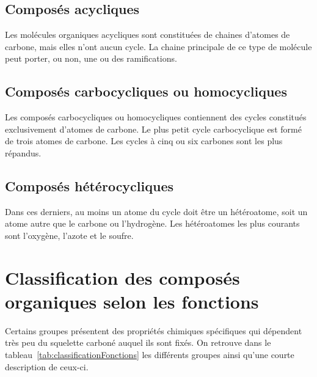 \subsection{Composés acycliques} Les molécules organiques acycliques sont constituées de chaines d'atomes de carbone, mais elles n'ont aucun cycle.
La chaine principale de ce type de molécule peut porter, ou non, une ou des ramifications.
\subsection{Composés carbocycliques ou homocycliques} Les composés carbocycliques ou homocycliques contiennent des cycles constitués exclusivement d'atomes de carbone.
Le plus petit cycle carbocyclique est formé de trois atomes de carbone.
Les cycles à cinq ou six carbones sont les plus répandus.
\subsection{Composés hétérocycliques} Dans ces derniers, au moins un atome du cycle doit être un hétéroatome, soit un atome autre que le carbone ou l'hydrogène.
Les hétéroatomes les plus courants sont l'oxygène, l'azote et le soufre.
\section{Classification des composés organiques selon les fonctions}
Certains groupes présentent des propriétés chimiques spécifiques qui dépendent très peu du squelette carboné auquel ils sont fixés. 
On retrouve dans le tableau~\ref{tab:classificationFonctions} les différents groupes
ainsi qu'une courte description de ceux-ci.

